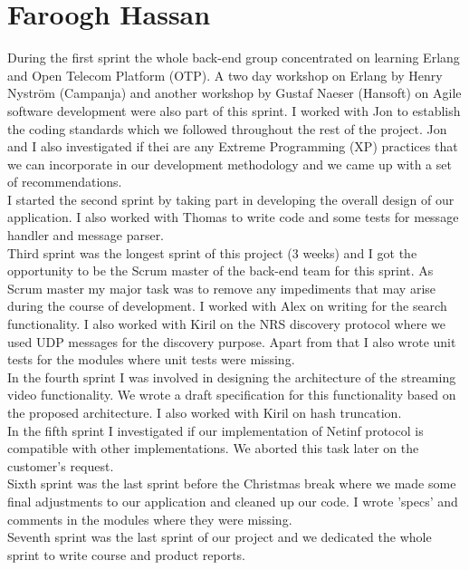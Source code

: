 \section{Faroogh Hassan}

During the first sprint the whole back-end group concentrated on learning Erlang and Open Telecom Platform (OTP). A two day workshop on Erlang by Henry Nystr\"om (Campanja) and another workshop by Gustaf Naeser (Hansoft) on Agile software development were also part of this sprint. I worked with Jon to establish the coding standards which we followed throughout the rest of the project. Jon and I also investigated if thei are any Extreme Programming (XP) practices that we can incorporate in our development methodology and we came up with a set of recommendations. \\

I started the second sprint by taking part in developing the overall design of our application. I also worked with Thomas to write code and some tests for message handler and message parser.\\

Third sprint was the longest sprint of this project (3 weeks) and I got the opportunity to be the Scrum master of the back-end team for this sprint. As Scrum master my major task was to remove any impediments that may arise during the course of development. I worked with Alex on writing for the search functionality. I also worked with Kiril on the NRS discovery protocol where we used UDP messages for the discovery purpose. Apart from that I also wrote unit tests for the modules where unit tests were missing. \\

In the fourth sprint I was involved in designing the architecture of the streaming video functionality. We wrote a draft specification for this functionality based on the proposed architecture. I also worked with Kiril on hash truncation. \\

In the fifth sprint I investigated if our implementation of Netinf protocol is compatible with other implementations. We aborted this task later on the customer's request. \\

Sixth sprint was the last sprint before the Christmas break where we made some final adjustments to our application and cleaned up our code. I wrote 'specs' and comments in the modules where they were missing. \\

Seventh sprint was the last sprint of our project and we dedicated the whole sprint to write course and product reports. \\
